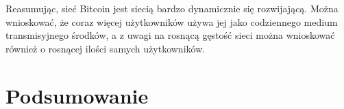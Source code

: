 \documentclass[12pt, twoside, final, openany]{mgr}
\begin{document}
\indent Reasumując, sieć Bitcoin jest siecią bardzo dynamicznie się rozwijającą. Można wnioskować, że coraz więcej użytkowników używa jej jako codziennego medium transmisyjnego środków, a z uwagi na rosnącą gęstość sieci można wnioskować również o rosnącej ilości samych użytkowników. 


\chapter*{Podsumowanie}




\listoffigures
\listoftables
\end{document}
